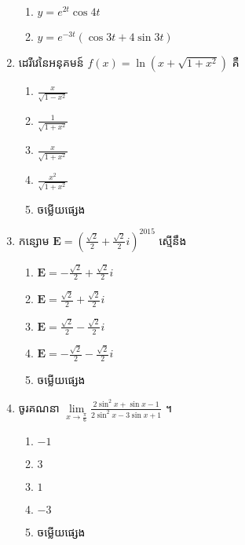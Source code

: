 \documentclass[12pt, a4paper]{article}
\begin{document}
\begin{enumerate}[m]
\begin{enumerate}[k,3]
 		\item $y=e^{2t}\cos4t$
 		\item $y=e^{-3t}\left(\cos3t+4\sin3t\right)$
 	\end{enumerate}
 	{\color{blue}\hrulefill}
 	\item ដេរីវេនៃអនុគមន៍ $f(x)=\ln\left(x+\sqrt{1+x^2}\right)$ គឺ
 	\begin{enumerate}[k,5]
 		\item $\frac{x}{\sqrt{1-x^2}}$
 		\item $\frac{1}{\sqrt{1+x^2}}$
 		\item $\frac{x}{\sqrt{1+x^2}}$
 		\item $\frac{x^2}{\sqrt{1+x^2}}$
 		\item ចម្លើយផ្សេង
 	\end{enumerate}
 	{\color{blue}\hrulefill}
 	\item កន្សោម $\mathbf{E}=\left(\frac{\sqrt{2}}{2}+\frac{\sqrt{2}}{2}i\right)^{2015}$ ស្មើនឹង
 	\begin{enumerate}[k,3]
 		\item $\mathbf{E}=-\frac{\sqrt{2}}{2}+\frac{\sqrt{2}}{2}i$
 		\item $\mathbf{E}= \frac{\sqrt{2}}{2}+\frac{\sqrt{2}}{2}i$
 		\item $\mathbf{E}=\frac{\sqrt{2}}{2}-\frac{\sqrt{2}}{2}i$
 		\item $\mathbf{E}=-\frac{\sqrt{2}}{2}-\frac{\sqrt{2}}{2}i$
 		\item ចម្លើយផ្សេង
 	\end{enumerate}
 	{\color{blue}\hrulefill}
 	\item ចូរគណនា $\lim\limits_{x\to\frac{\pi}{6}}\frac{2\sin^2x+\sin x-1}{2\sin^2x-3\sin x+1}$ ។
 	\begin{enumerate}[k,5]
 		\item $-1$
 		\item $3$
 		\item $1$
 		\item $-3$
 		\item ចម្លើយផ្សេង
 	\end{enumerate}
 	{\color{blue}\hrulefill}\\
\end{enumerate}
\makeads
\newpage
\maketitle\koc
{\color{blue}\hrulefill}
\end{document}
